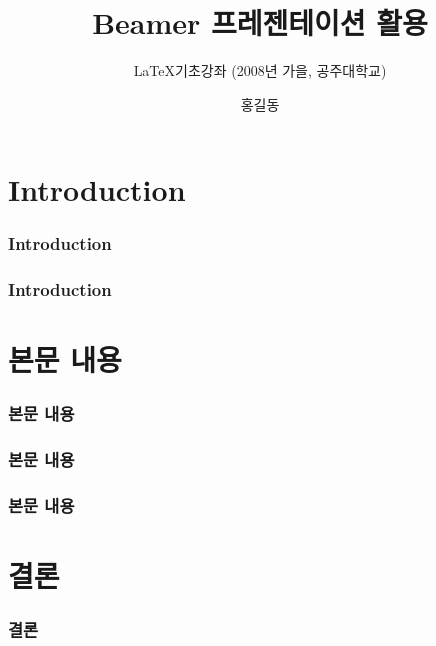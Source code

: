 \documentclass[10pt,compress,slidetop,%
			   xcolor={svgnames},%
			   t]{beamer}
\title %
{Beamer 프레젠테이션 활용}
\subtitle{\LaTeX 기초강좌 (2008년 가을, 공주대학교)}
\author{홍길동}	%
\institute[] 															%
{자신의 소속 기관}													%
\date[08-11-09] 														%
{}																			%
\begin{document}
% 
\begin{frame}
  \titlepage
\end{frame}
%
\section{Introduction}
%
\begin{frame}
	\frametitle{Introduction}
	
\end{frame}
%
\begin{frame}
	\frametitle{Introduction}
	
\end{frame}
% 
\section{본문 내용}
%
\begin{frame}
	\frametitle{본문 내용}
	
\end{frame}
%
\begin{frame}
	\frametitle{본문 내용}
	
\end{frame}
%
\begin{frame}
	\frametitle{본문 내용}
	
\end{frame}
%
\section{결론}
%
\begin{frame}
	\frametitle{결론}
	
\end{frame}
%
%
\end{document}
